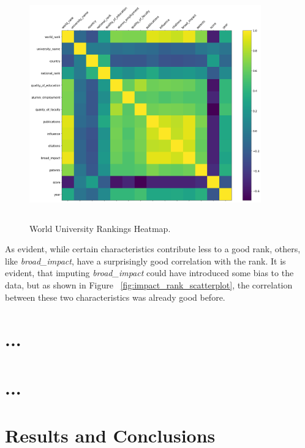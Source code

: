 \documentclass{article}
\begin{document}
\begin{figure}[h]
\centering
		\includegraphics[width=10cm,height=10cm,keepaspectratio]{graphs/world_uni_hm}
		\caption{World University Rankings Heatmap.}
\end{figure}

As evident, while certain characteristics contribute less to a good rank, others, like \emph{broad\_impact}, have a surprisingly good correlation with the rank. It is evident, that imputing  \emph{broad\_impact} could have introduced some bias to the data, but as shown in Figure ~\ref{fig:impact_rank_scatterplot}, the correlation between these two characteristics was already good before.
\section{...}



\section{...}

\section{Results and Conclusions}






\end{document}
